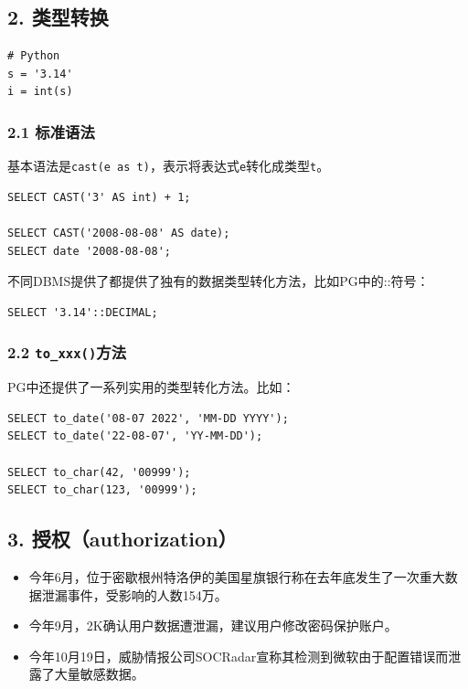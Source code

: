 \documentclass[aspectratio=169, 14pt]{beamer}
\begin{document}
\begin{frame}[fragile]
    \section{\textcolor{darkmidnightblue}{2. 类型转换}}
    \begin{verbatim}
# Python
s = '3.14'
i = int(s)
    \end{verbatim}
\end{frame}

\begin{frame}[fragile]
    \frametitle{2.1 标准语法}
基本语法是\alert{\texttt{cast(e as t)}}，表示将表达式\texttt{e}转化成类型\texttt{t}。   

\begin{verbatim}
SELECT CAST('3' AS int) + 1;

SELECT CAST('2008-08-08' AS date);
SELECT date '2008-08-08';
\end{verbatim}
\pause
不同DBMS提供了都提供了独有的数据类型转化方法，比如PG中的\alert{::}符号：
\begin{verbatim}
SELECT '3.14'::DECIMAL;
\end{verbatim}

\end{frame}

\begin{frame}[fragile]
    \frametitle{2.2 \texttt{to\_xxx()}方法}
PG中还提供了一系列实用的类型转化方法。比如：

\begin{verbatim}
SELECT to_date('08-07 2022', 'MM-DD YYYY');
SELECT to_date('22-08-07', 'YY-MM-DD');

SELECT to_char(42, '00999');
SELECT to_char(123, '00999');
\end{verbatim}

\end{frame}

\begin{frame}[fragile]
    \section{\textcolor{darkmidnightblue}{3. 授权（authorization）}}

    \begin{itemize}
        \item 今年6月，位于密歇根州特洛伊的美国星旗银行称在去年底发生了一次重大数据泄漏事件，受影响的人数154万。
        \item 今年9月，2K确认用户数据遭泄漏，建议用户修改密码保护账户。
        \item 今年10月19日，威胁情报公司SOCRadar宣称其检测到微软由于配置错误而泄露了大量敏感数据。
    \end{itemize}
\end{frame}
\end{document}
